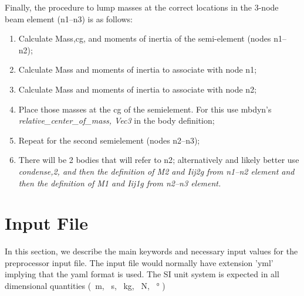 \documentclass[report]{nrel}
\begin{document}
Finally, the procedure to lump masses at the correct locations in the 3-node beam element (\gls{n1}--\gls{n3}) is as follows:
\begin{enumerate}
	\item Calculate \gls{Mass},\gls{cg}, and moments of inertia of the semi-element (nodes \gls{n1}--\gls{n2}); 
	\item Calculate  \gls{Mass} and moments of inertia to associate with node \gls{n1}; 
\item	Calculate  \gls{Mass} and moments of inertia to associate with node \gls{n2}; 
\item	Place those masses at the \gls{cg} of the semielement. For this use \gls{mbdyn}'s \emph{relative\_center\_of\_mass, Vec3} in the body definition;
\item	Repeat for the second semielement (nodes \gls{n2}--\gls{n3});
\item	There will be 2 bodies that will refer to \gls{n2}; alternatively and likely better use \emph{condense,2, and then the definition of \gls{M2} and \gls{Iij2g} from \gls{n1}--\gls{n2} element and then the definition of \gls{M1} and \gls{Iij1g} from \gls{n2}--\gls{n3} element.} 
\end{enumerate}

\section{Input File}\label{sec:inputfile}

In this section, we describe the main keywords and necessary input values for the preprocessor input file. The input file would normally have extension 'yml' implying that the \gls{yaml} format is used. The SI unit system is expected in all dimensional quantities (\SI{}{\m}, \SI{}{\s}, \SI{}{\kg}, \SI{}{\N}, \SI{}{\degree} )
\end{document}
